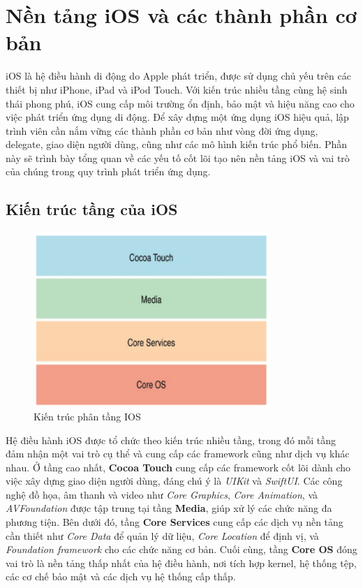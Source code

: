 
\section{Nền tảng iOS và các thành phần cơ bản}
iOS là hệ điều hành di động do Apple phát triển, được sử dụng chủ yếu trên các thiết bị như iPhone, iPad và iPod Touch. Với kiến trúc nhiều tầng cùng hệ sinh thái phong phú, iOS cung cấp môi trường ổn định, bảo mật và hiệu năng cao cho việc phát triển ứng dụng di động. Để xây dựng một ứng dụng iOS hiệu quả, lập trình viên cần nắm vững các thành phần cơ bản như vòng đời ứng dụng, delegate, giao diện người dùng, cũng như các mô hình kiến trúc phổ biến. Phần này sẽ trình bày tổng quan về các yếu tố cốt lõi tạo nên nền tảng iOS và vai trò của chúng trong quy trình phát triển ứng dụng.
    \subsection{Kiến trúc tầng của iOS}
        \begin{flushleft}
            \begin{figure}[H] %
                \centering
                \includegraphics[width=0.8\textwidth]{images/kientrucios.png}
                \caption{Kiến trúc phân tầng IOS}
                \label{fig:kientrucios}
            \end{figure}

            Hệ điều hành iOS được tổ chức theo kiến trúc nhiều tầng, trong đó mỗi tầng đảm nhận một vai trò cụ thể và cung cấp các framework cũng như dịch vụ khác nhau. Ở tầng cao nhất, \textbf{Cocoa Touch} cung cấp các framework cốt lõi dành cho việc xây dựng giao diện người dùng, đáng chú ý là \textit{UIKit} và \textit{SwiftUI}. Các công nghệ đồ họa, âm thanh và video như \textit{Core Graphics}, \textit{Core Animation}, và \textit{AVFoundation} được tập trung tại tầng \textbf{Media}, giúp xử lý các chức năng đa phương tiện. Bên dưới đó, tầng \textbf{Core Services} cung cấp các dịch vụ nền tảng cần thiết như \textit{Core Data} để quản lý dữ liệu, \textit{Core Location} để định vị, và \textit{Foundation framework} cho các chức năng cơ bản. Cuối cùng, tầng \textbf{Core OS} đóng vai trò là nền tảng thấp nhất của hệ điều hành, nơi tích hợp kernel, hệ thống tệp, các cơ chế bảo mật và các dịch vụ hệ thống cấp thấp.

       
        \end{flushleft}

